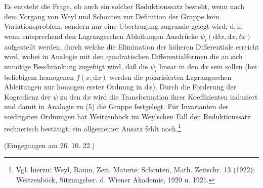 \documentclass[11pt]{article}
\providecommand{\dd}{\mathrm d}
\begin{document}
Es entsteht die Frage, ob auch ein solcher Reduktionssatz besteht, wenn nach dem Vorgang von Weyl und Schouten zur Definition der Gruppe kein Variationsproblem, sondern nur eine Übertragung zugrunde gelegt wird; d.\,h. wenn entsprechend den Lagrangeschen Ableitungen Ausdrücke $\psi_i(\dd\delta x,\dd x,\delta x)$ aufgestellt werden, durch welche die Elimination der höheren Differentiale erreicht wird, wobei in Analogie mit den quadratischen Differentialformen die an sich unnötige Beschränkung zugefügt wird, daß die $\psi_i$ linear in den $\dd x$ sein sollen (bei beliebigem homogenen $f(x,\dd x)$ werden die polarisierten Lagrangeschen Ableitungen nur homogen erster Ordnung in $\dd x$). Durch die Forderung der Kogredienz der $\psi$ zu den $\dd x$ wird die Transformation ihrer Koeffizienten induziert und damit in Analogie zu (5) die Gruppe festgelegt. Für Invarianten der niedrigsten Ordnungen hat Weitzenböck im Weylschen Fall den Reduktionssatz rechnerisch bestätigt; ein allgemeiner Ansatz fehlt noch.\footnote{Vgl. hierzu: Weyl, Raum, Zeit, Materie; Schouten, Math. Zeitschr. 13 (1922); Weitzenböck, Sitzungsber. d. Wiener Akademie, 1920 u. 1921.}

\begin{center}
(Eingegangen am 26. 10. 22.)
\end{center}
\end{document}
